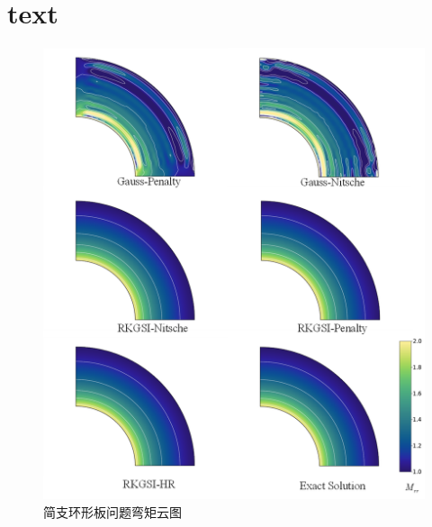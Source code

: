 \chapter{text}
\begin{figure}[H]
    \centering
    \includegraphics[scale=0.7]{figure/PHR/A/Mxy.png}
    \caption{简支环形板问题弯矩云图}\label{AMxy}
\end{figure}

